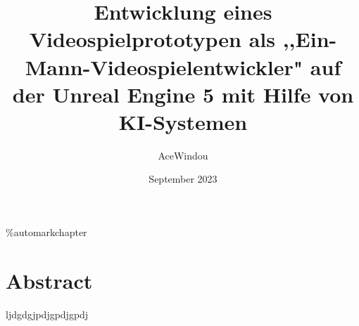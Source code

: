 \documentclass[11pt,a4paper]{scrreprt}
\title{Entwicklung eines Videospielprototypen als ,,Ein-Mann-Videospielentwickler" auf der Unreal Engine 5 mit Hilfe von KI-Systemen}
\author{AceWindou }
\date{September 2023}
\begin{document}
\sffamily
\maketitle

\%automark{chapter}
\cfoot*{}
\ofoot*{\pagemark}


\renewcommand*\chapterheadstartvskip{\vspace*{0cm}} %

\chapter*{Abstract}
ljdgdgjpdjgpdjgpdj


\tableofcontents
\listoffigures
\listoftables
\newpage










\setcounter{page}{5} %








\end{document}
